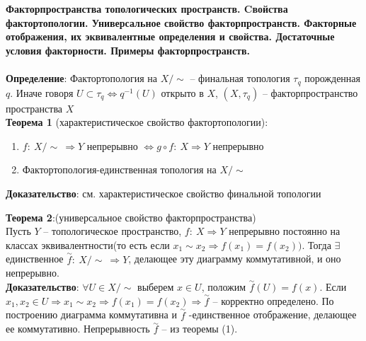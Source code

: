 \section{}
	\textbf{Факторпространства топологических пространств. Cвойства фактортопологии. Универсальное свойство факторпространств. Факторные отображения, их эквивалентные определения и свойства. Достаточные условия факторности. Примеры факторпространств.}\\
	\\
	\textbf{Определение}: Фактортопология на $X\slash \sim$ -- финальная топология ${\tau}_{q}$ порожденная $q$. Иначе говоря $U\subset {\tau}_{q} \Leftrightarrow q^{-1}(U)$ открыто в $X$, $(X, {\tau}_{q})$ -- факторпространство пространства $X$\\
	\textbf{Теорема 1} (характеристическое свойство фактортопологии):
	\begin{enumerate}
		\item 
		$f:\ X\slash \sim\ \Rightarrow Y$ непрерывно $\Leftrightarrow g \circ f:\ X \Rightarrow Y$ непрерывно
		\item 
		Фактортопология-единственная топология на $X\slash \sim $
	\end{enumerate}
	\textbf{Доказательство}: см. характеристическое свойство финальной топологии\\
	\begin{figure}[h]
	\end{figure}
	\textbf{Теорема 2}:(универсальное свойство факторпространства)\\
	Пусть $Y$ -- топологическое пространство, $f:\ X\Rightarrow Y$ непрерывно постоянно на классах эквивалентности(то есть если $x_1 \sim x_2 \Rightarrow f(x_1) = f(x_2))$. Тогда $\exists$ единственное $\overset{\sim}{f}:\ X\slash \sim\ \Rightarrow Y$, делающее эту диаграмму коммутативной, и оно непрерывно.\\
	\textbf{Доказательство}: $\forall U\in X\slash \sim$ выберем $x\in U$, положим $\overset{\sim}{f}(U)=f(x)$. Если $x_1, x_2 \in U \Rightarrow x_1 \sim x_2 \Rightarrow f(x_1) = f(x_2) \Rightarrow \overset{\sim}{f}$ -- корректно определено. По построению диаграмма коммутативна и $\overset{\sim}{f}$ -единственное отображение, делающее ее коммутативно. Непрерывность $\overset{\sim}{f}$ -- из теоремы (1).\\
	\begin{figure}[h]
	\end{figure}
